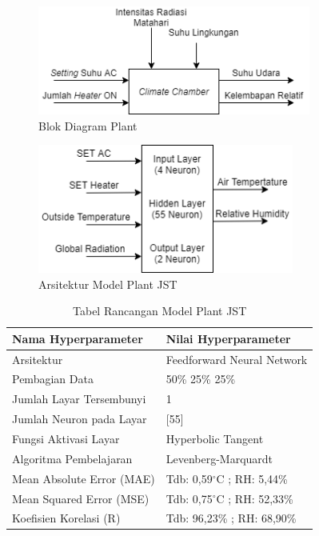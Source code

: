 \begin{figure}[!h]
	\centering
	\includegraphics[width=0.8\textwidth]{figures/BlokDiagramPlant}
	\caption{Blok Diagram Plant}
	\label{fig:5:BlokDiagramPlant}
\end{figure}

\begin{figure}[!h]
	\centering
	\includegraphics[width=0.75\textwidth]{figures/NNPlantModelDesign}
	\caption{Arsitektur Model Plant JST}
	\label{fig:5:NNPlantModelDesign}
\end{figure}
\vspace{1em}

\begin{table}[!h]
	\caption{Tabel Rancangan Model Plant JST\cite{skripsiTanto}}
	\label{tbl:5:NNPlantTanto}
	\centering
	\begin{tabular}{|p{5cm}|p{5.2cm}|}
		\hline
		\textbf{Nama Hyperparameter} & \textbf{Nilai Hyperparameter} \\ \hline
		Arsitektur & Feedforward Neural Network \\ \hline
		Pembagian Data & 50\% 25\% 25\% \\ \hline 
		Jumlah Layar Tersembunyi & 1 \\ \hline
		Jumlah Neuron pada Layar & [55] \\ \hline
		Fungsi Aktivasi Layar & Hyperbolic Tangent \\ \hline
		Algoritma Pembelajaran & Levenberg-Marquardt \\ \hline
		Mean Absolute Error (MAE) & Tdb: 0,59$^\circ$C ; RH: 5,44\% \\ \hline
		Mean Squared Error (MSE) & Tdb: 0,75$^\circ$C ; RH: 52,33\% \\ \hline
		Koefisien Korelasi (R) & Tdb: 96,23\% ; RH: 68,90\% \\ \hline
	\end{tabular}
\end{table}

